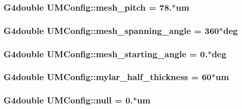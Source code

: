 \subsubsection[{mesh\+\_\+pitch}]{\setlength{\rightskip}{0pt plus 5cm}G4double U\+M\+Config\+::mesh\+\_\+pitch = 78.$\ast$um}\label{structUMConfig_a01eccb4b99640dc0d93bf74496c1184e}
\hypertarget{structUMConfig_a777f6e7384a40265f70f945c93c66820}{}
\subsubsection[{mesh\+\_\+spanning\+\_\+angle}]{\setlength{\rightskip}{0pt plus 5cm}G4double U\+M\+Config\+::mesh\+\_\+spanning\+\_\+angle = 360$\ast$deg}\label{structUMConfig_a777f6e7384a40265f70f945c93c66820}
\hypertarget{structUMConfig_a068cd29afc69e9296e6da884e7b6c4ac}{}
\subsubsection[{mesh\+\_\+starting\+\_\+angle}]{\setlength{\rightskip}{0pt plus 5cm}G4double U\+M\+Config\+::mesh\+\_\+starting\+\_\+angle = 0.$\ast$deg}\label{structUMConfig_a068cd29afc69e9296e6da884e7b6c4ac}
\hypertarget{structUMConfig_a01cc15c40820340a99b62ad488e8f389}{}
\subsubsection[{mylar\+\_\+half\+\_\+thickness}]{\setlength{\rightskip}{0pt plus 5cm}G4double U\+M\+Config\+::mylar\+\_\+half\+\_\+thickness = 60$\ast$um}\label{structUMConfig_a01cc15c40820340a99b62ad488e8f389}
\hypertarget{structUMConfig_ab3f35a95923333ff2eedff08309662ca}{}
\subsubsection[{null}]{\setlength{\rightskip}{0pt plus 5cm}G4double U\+M\+Config\+::null = 0.$\ast$um}\label{structUMConfig_ab3f35a95923333ff2eedff08309662ca}
\hypertarget{structUMConfig_aefea0e00593d3272310b5f9918c411b3}{}
